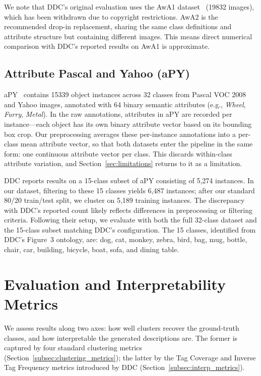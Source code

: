 We note that DDC's original evaluation uses the AwA1 dataset~\citep{Lampert2013} (19832 images), which has been withdrawn due to copyright restrictions. AwA2 is the recommended drop-in replacement, sharing the same class definitions and attribute structure but containing different images. This means direct numerical comparison with DDC's reported results on AwA1 is approximate.


\subsection{Attribute Pascal and Yahoo (aPY)}
\label{subsec:apy}

aPY~\citep{Farhadi2009} contains 15339 object instances across 32 classes from Pascal VOC 2008 and Yahoo images, annotated with 64 binary semantic attributes (e.g., \textit{Wheel}, \textit{Furry}, \textit{Metal}). In the raw annotations, attributes in aPY are recorded per instance---each object has its own binary attribute vector based on its bounding box crop. Our preprocessing averages these per-instance annotations into a per-class mean attribute vector, so that both datasets enter the pipeline in the same form: one continuous attribute vector per class. This discards within-class attribute variation, and Section~\ref{sec:limitations} returns to it as a limitation.

DDC reports results on a 15-class subset of aPY consisting of 5,274 instances. In our dataset, filtering to these 15 classes yields 6,487 instances; after our standard 80/20 train/test split, we cluster on 5,189 training instances. The discrepancy with DDC's reported count likely reflects differences in preprocessing or filtering criteria. Following their setup, we evaluate with both the full 32-class dataset and the 15-class subset matching DDC's configuration. The 15 classes, identified from DDC's Figure~3 ontology, are: dog, cat, monkey, zebra, bird, bag, mug, bottle, chair, car, building, bicycle, boat, sofa, and dining table.


\section{Evaluation and Interpretability Metrics}
\label{sec:metrics}

We assess results along two axes: how well clusters recover the ground-truth classes, and how interpretable the generated descriptions are. The former is captured by four standard clustering metrics (Section~\ref{subsec:clustering_metrics}); the latter by the Tag Coverage and Inverse Tag Frequency metrics introduced by DDC (Section~\ref{subsec:interp_metrics}).

